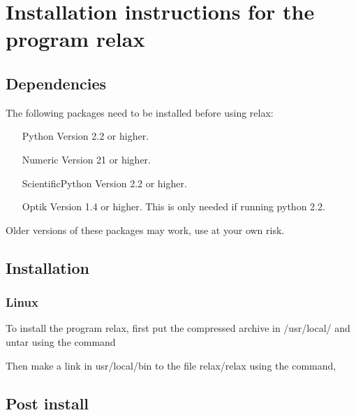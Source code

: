 
\chapter{Installation instructions for the program relax}



\section{Dependencies}

The following packages need to be installed before using relax:

\begin{itemize}
\item[Python]  Version 2.2 or higher.
\item[Numeric]  Version 21 or higher.
\item[ScientificPython]  Version 2.2 or higher.
\item[Optik]  Version 1.4 or higher.  This is only needed if running python 2.2.
\end{itemize}

Older versions of these packages may work, use at your own risk.




\section{Installation}


\subsection{Linux}


To install the program relax, first put the compressed archive in /usr/local/ and untar using the
command


Then make a link in usr/local/bin to the file relax/relax using the command,





\section{Post install}

